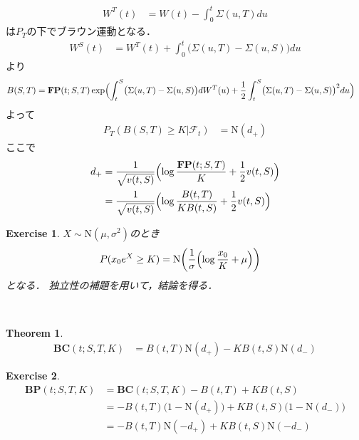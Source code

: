 \documentclass[11pt, a4paper]{jsarticle}
\newcommand{\FP}{\textbf{FP}}
\newcommand{\BC}{\textbf{BC}}
\newcommand{\BP}{\textbf{BP}}
\newtheorem{theorem}[assumption]{Theorem}
\newtheorem{exercise}{Exercise}[section]
\begin{document}
\begin{align}
W^T(t)
& =
W(t) - \int_0^t \Sigma(u, T) du \nonumber
\end{align}
は$P_T$の下でブラウン運動となる．
\begin{align}
W^S(t)
& =
W^T(t) + \int_0^t \bigl( \Sigma(u, T) - \Sigma(u, S) \bigr) du \nonumber
\end{align}
より
\begin{align}
B(S, T)
& =
\FP(t; S, T)
\exp \Bigl( \int_t^S \bigl( \Sigma(u, T) - \Sigma(u, S) \bigr) dW^T(u) + \frac{1}{2} \int_t^S \bigl( \Sigma(u, T) - \Sigma(u, S) \bigr)^2 du \Bigr) \nonumber
\end{align}
よって
\begin{align}
P_T (B(S, T) \geq K | \mathcal{F}_t)
& =
\mathrm{N} (d_+) \nonumber
\end{align}
ここで
\begin{align}
d_+
& =
\frac{1}{\sqrt{v(t, S)}} \Bigl( \log \frac{\FP(t; S, T)}{K} + \frac{1}{2} v(t, S) \Bigr) \nonumber \\
& =
\frac{1}{\sqrt{v(t, S)}} \Bigl( \log \frac{B(t, T)}{K B(t, S)} + \frac{1}{2} v(t, S) \Bigr) \nonumber
\end{align}

\hrulefill
\begin{exercise}
$X \sim \mathrm{N} (\mu, \sigma^2)$のとき
\begin{align}
P(x_0 e^X \geq K)
& =
\mathrm{N} \biggl( \frac{1}{\sigma} \Bigl( \log \frac{x_0}{K} + \mu \Bigr) \biggr) \nonumber
\end{align}
となる．
独立性の補題を用いて，結論を得る．
\end{exercise}
\hrulefill \\

\begin{theorem}
\begin{align}
\BC(t; S, T, K)
& =
B(t, T) \mathrm{N}(d_+) - K B(t, S) \mathrm{N}(d_-) \nonumber
\end{align}
\end{theorem}

\hrulefill
\begin{exercise}
\begin{align}
\BP(t; S, T, K)
& =
\BC(t; S, T, K) - B(t, T) + K B(t, S) \nonumber \\
& =
- B(t, T) \bigl( 1 - \mathrm{N}(d_+) \bigr) + K B(t, S) \bigl( 1 - \mathrm{N}(d_-) \bigr) \nonumber \\
& =
- B(t, T) \mathrm{N}(-d_+) + K B(t, S) \mathrm{N}(-d_-) \nonumber
\end{align}
\end{exercise}
\hrulefill \\
\end{document}

